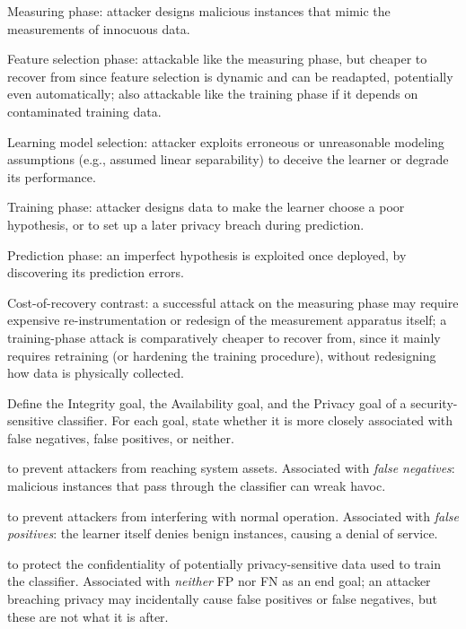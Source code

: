 \documentclass[10pt]{extarticle}
\newcommand{\resposta}[1]{\par\smallskip\noindent #1}
\begin{document}
\begin{questoes}
\resposta{
\begin{topicos}
\item Measuring phase: attacker designs malicious instances that mimic the measurements of innocuous data.
\item Feature selection phase: attackable like the measuring phase, but cheaper to recover from since feature selection is dynamic and can be readapted, potentially even automatically; also attackable like the training phase if it depends on contaminated training data.
\item Learning model selection: attacker exploits erroneous or unreasonable modeling assumptions (e.g., assumed linear separability) to deceive the learner or degrade its performance.
\item Training phase: attacker designs data to make the learner choose a poor hypothesis, or to set up a later privacy breach during prediction.
\item Prediction phase: an imperfect hypothesis is exploited once deployed, by discovering its prediction errors.
\item Cost-of-recovery contrast: a successful attack on the measuring phase may require expensive re-instrumentation or redesign of the measurement apparatus itself; a training-phase attack is comparatively cheaper to recover from, since it mainly requires retraining (or hardening the training procedure), without redesigning how data is physically collected.
\end{topicos}
}

\item Define the Integrity goal, the Availability goal, and the Privacy goal of a security-sensitive classifier. For each goal, state whether it is more closely associated with false negatives, false positives, or neither.

\resposta{
\begin{topicos}
\item[Integrity goal:] to prevent attackers from reaching system assets. Associated with \emph{false negatives}: malicious instances that pass through the classifier can wreak havoc.
\item[Availability goal:] to prevent attackers from interfering with normal operation. Associated with \emph{false positives}: the learner itself denies benign instances, causing a denial of service.
\item[Privacy goal:] to protect the confidentiality of potentially privacy-sensitive data used to train the classifier. Associated with \emph{neither} FP nor FN as an end goal; an attacker breaching privacy may incidentally cause false positives or false negatives, but these are not what it is after.
\end{topicos}
}


\end{questoes}
\end{document}
